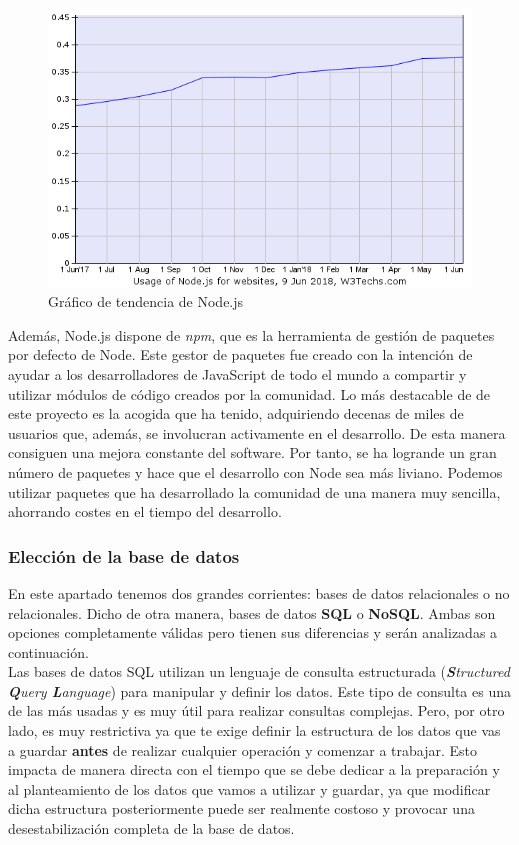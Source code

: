 \begin{figure}[H]
	\centering
	\includegraphics[scale=0.65]{imagenes/nodejs-trend.png}
	\caption{Gráfico de tendencia de Node.js \cite{nodejs-trend} \label{fig:figura4}}
\end{figure}

Además, Node.js dispone de \textit{npm}\cite{npm}, que es la herramienta de gestión de paquetes por defecto de Node. Este
gestor de paquetes fue creado con la intención de ayudar a los desarrolladores de JavaScript  de todo el mundo a compartir y utilizar
módulos de código creados por la comunidad. Lo más destacable de
de este proyecto es la acogida que ha tenido, adquiriendo decenas de miles de usuarios que, además, se involucran
activamente en el desarrollo. De esta manera consiguen una mejora constante del software. Por tanto, se ha logrande
un gran número de paquetes y hace que el desarrollo con Node sea más liviano. Podemos utilizar paquetes que 
ha desarrollado la comunidad de una manera muy sencilla, ahorrando costes en el tiempo del desarrollo.


\subsubsection{Elección de la base de datos}

En este apartado tenemos dos grandes corrientes: bases de datos relacionales o no relacionales. Dicho de otra manera,
bases de datos \textbf{SQL} o \textbf{NoSQL}. Ambas son opciones completamente válidas pero tienen sus diferencias y serán analizadas a continuación.\\

Las bases de datos SQL utilizan un lenguaje de consulta estructurada (\textit{\textbf{S}tructured \textbf{Q}uery \textbf{L}anguage}) para manipular
y definir los datos. Este tipo de consulta es una de las más usadas y es muy útil para realizar consultas complejas. 
Pero, por otro lado, es muy restrictiva ya que te exige definir la estructura de los datos que vas a guardar \textbf{antes} 
de realizar cualquier operación y comenzar a trabajar. Esto impacta de manera directa con el tiempo que se debe dedicar a 
la preparación y al planteamiento de los datos que vamos a utilizar y guardar, ya que modificar dicha estructura posteriormente
puede ser realmente costoso y provocar una desestabilización completa de la base de datos.\\

